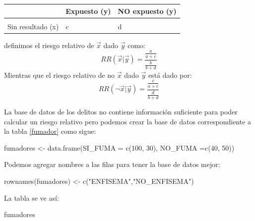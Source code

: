 \documentclass[
]{book}
\newenvironment{Shaded}{\begin{snugshade}}{\end{snugshade}}
\newcommand{\AttributeTok}[1]{\textcolor[rgb]{0.77,0.63,0.00}{#1}}
\newcommand{\DecValTok}[1]{\textcolor[rgb]{0.00,0.00,0.81}{#1}}
\newcommand{\FunctionTok}[1]{\textcolor[rgb]{0.00,0.00,0.00}{#1}}
\newcommand{\NormalTok}[1]{#1}
\newcommand{\OtherTok}[1]{\textcolor[rgb]{0.56,0.35,0.01}{#1}}
\newcommand{\StringTok}[1]{\textcolor[rgb]{0.31,0.60,0.02}{#1}}
\begin{document}
\begin{table}
\centering
\begin{tabular}{l|l|l}
\hline
  & Expuesto (y) & NO expuesto (y)\\
\hline
\cellcolor{gray!6}{Resultado (x)} & \cellcolor{gray!6}{a} & \cellcolor{gray!6}{b}\\
\hline
Sin resultado (x) & c & d\\
\hline
\end{tabular}
\end{table}

definimos el riesgo relativo de \(\vec{x}\) dado \(\vec{y}\) como:
\[
RR(\vec{x}|\vec{y}) = \dfrac{\frac{a}{a + c}}{\frac{b}{b + d}}
\]
Mientras que el riesgo relativo de no \(\vec{x}\) dado \(\vec{y}\) está dado por:
\[
RR(\neg \vec{x}|\vec{y}) = \dfrac{\frac{c}{a + c}}{\frac{d}{b + d}}
\]

La base de datos de los delitos no contiene información suficiente para poder calcular un riesgo relativo pero podemos crear la base de datos correspondiente a la tabla \ref{fumador} como sigue:

\begin{Shaded}
\begin{Highlighting}[]
\NormalTok{fumadores }\OtherTok{\textless{}{-}} \FunctionTok{data.frame}\NormalTok{(}\AttributeTok{SI\_FUMA =} \FunctionTok{c}\NormalTok{(}\DecValTok{100}\NormalTok{, }\DecValTok{30}\NormalTok{), }\AttributeTok{NO\_FUMA =}\FunctionTok{c}\NormalTok{(}\DecValTok{40}\NormalTok{, }\DecValTok{50}\NormalTok{))}
\end{Highlighting}
\end{Shaded}

Podemos agregar nombres a las filas para tener la base de datos mejor:

\begin{Shaded}
\begin{Highlighting}[]
\FunctionTok{rownames}\NormalTok{(fumadores) }\OtherTok{\textless{}{-}} \FunctionTok{c}\NormalTok{(}\StringTok{"ENFISEMA"}\NormalTok{,}\StringTok{"NO\_ENFISEMA"}\NormalTok{)}
\end{Highlighting}
\end{Shaded}

La tabla se ve así:

\begin{Shaded}
\begin{Highlighting}[]
\NormalTok{fumadores}
\end{Highlighting}
\end{Shaded}
\end{document}
